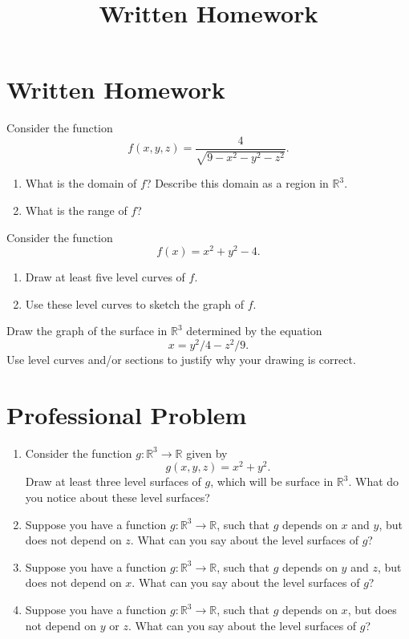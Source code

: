 \documentclass{ximera}
\title{Written Homework}
\begin{document}
\begin{abstract}
\end{abstract}
\maketitle

\section{Written Homework}

\begin{problem}
Consider the function
\[
f(x,y,z) = \frac{4}{\sqrt{9-x^2-y^2-z^2}}.
\]
\begin{enumerate}
\item What is the domain of $f$? Describe this domain as a region in $\mathbb{R}^3$.
\item What is the range of $f$?
\end{enumerate}
\end{problem}

\begin{problem}
Consider the function 
\[
f(x) = x^2 + y^2 - 4.
\]
\begin{enumerate}
\item Draw at least five level curves of $f$.
\item Use these level curves to sketch the graph of $f$.
\end{enumerate}
\end{problem}

\begin{problem}
Draw the graph of the surface in $\mathbb{R}^3$ determined by the equation
\[
x = y^2/4 - z^2/9.
\]
Use level curves and/or sections to justify why your drawing is correct.
\end{problem}

\section{Professional Problem}

\begin{problem}

\begin{enumerate}
\item Consider the function $g:\mathbb{R}^3\rightarrow\mathbb{R}$ given by
\[
g(x,y,z) = x^2+y^2.
\]
Draw at least three level surfaces of $g$, which will be surface in $\mathbb{R}^3$. What do you notice about these level surfaces?
\item Suppose you have a function $g:\mathbb{R}^3\rightarrow\mathbb{R}$, such that $g$ depends on $x$ and $y$, but does not depend on $z$. What can you say about the level surfaces of $g$? 
\item Suppose you have a function $g:\mathbb{R}^3\rightarrow\mathbb{R}$, such that $g$ depends on $y$ and $z$, but does not depend on $x$. What can you say about the level surfaces of $g$? 
\item Suppose you have a function $g:\mathbb{R}^3\rightarrow\mathbb{R}$, such that $g$ depends on $x$, but does not depend on $y$ or $z$. What can you say about the level surfaces of $g$? 
\end{enumerate}
\end{problem}
\end{document}
